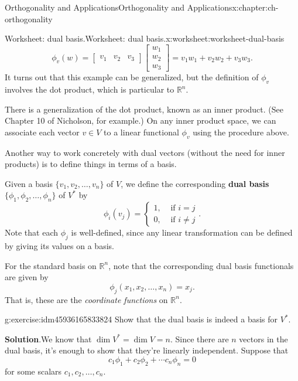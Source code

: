 \documentclass[oneside,10pt,]{book}
\newcommand{\blocktitlefont}{\relax}
\newcommand{\terminology}[1]{\textbf{#1}}
\numberwithin{equation}{section}
\newcommand{\bbm}{\begin{bmatrix}}
\newcommand{\ebm}{\end{bmatrix}}
\newcommand{\R}{\mathbb{R}}
\newcommand{\amp}{&}
\begin{document}
\begin{chapterptx}{Orthogonality and Applications}{}{Orthogonality and Applications}{}{}{x:chapter:ch-orthogonality}
\begin{worksheet-section}{Worksheet: dual basis.}{}{Worksheet: dual basis.}{}{}{x:worksheet:worksheet-dual-basis}
\begin{equation*}
\phi_{v}(w) = \bbm v_1\amp v_2\amp v_3\ebm\bbm w_1\\w_2\\w_3\ebm = v_1w_1+v_2w_2+v_3w_3\text{.}
\end{equation*}
It turns out that this example can be generalized, but the definition of \(\phi_v\) involves the dot product, which is particular to \(\R^n\).%
\par
There is a generalization of the dot product, known as an inner product. (See Chapter 10 of Nicholson, for example.) On any inner product space, we can associate each vector \(v\in V\) to a linear functional \(\phi_v\) using the procedure above.%
\par
Another way to work concretely with dual vectors (without the need for inner products) is to define things in terms of a basis.%
\par
Given a basis \(\{v_1,v_2,\ldots, v_n\}\) of \(V\), we define the corresponding \terminology{dual basis} \(\{\phi_1,\phi_2,\ldots, \phi_n\}\) of \(V^*\) by%
\begin{equation*}
\phi_i(v_j) = \begin{cases} 1, \amp \text{ if } i=j\\ 0, \amp \text{ if } i\neq j\end{cases}\text{.}
\end{equation*}
Note that each \(\phi_j\) is well-defined, since any linear transformation can be defined by giving its values on a basis.%
\par
For the standard basis on \(\R^n\), note that the corresponding dual basis functionals are given by%
\begin{equation*}
\phi_j(x_1,x_2,\ldots, x_n) = x_j\text{.}
\end{equation*}
That is, these are the \emph{coordinate functions} on \(\R^n\).%
\begin{divisionexercise}{1}{}{}{g:exercise:idm45936165833824}%
Show that the dual basis is indeed a basis for \(V^*\).%
\par\smallskip%
\noindent\textbf{\blocktitlefont Solution}.\label{g:solution:idm45936165832624}{}\hypertarget{g:solution:idm45936165832624}{}\quad{}We know that \(\dim V^* = \dim V=n\). Since there are \(n\) vectors in the dual basis, it's enough to show that they're linearly independent. Suppose that%
\begin{equation*}
c_1\phi_1+c_2\phi_2+\cdots c_n\phi_n=0
\end{equation*}
for some scalars \(c_1,c_2,\ldots, c_n\).%
\par

\end{divisionexercise}
\end{worksheet-section}
\end{chapterptx}
\end{document}
